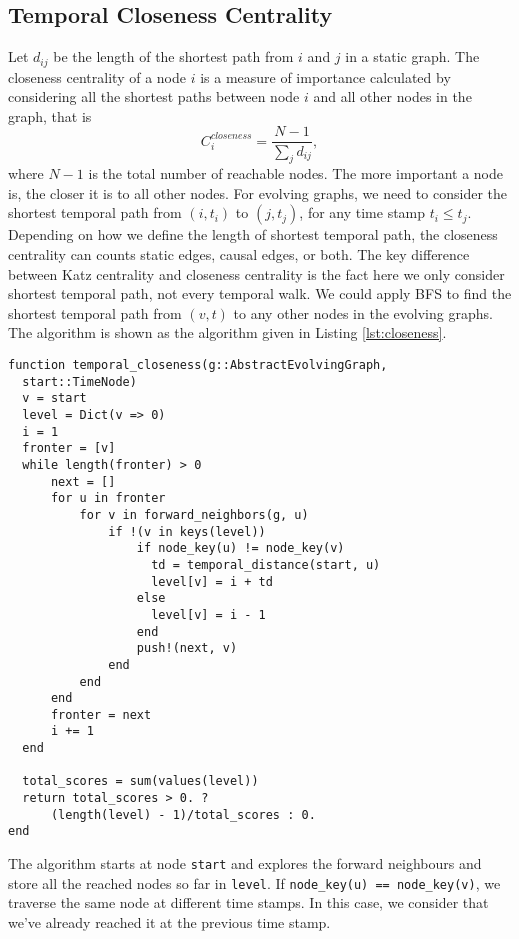 \documentclass[12pt]{article}
\theoremstyle{definition}
\begin{document}
\subsection{Temporal Closeness Centrality}
\label{sec:temp-betw-centr}

Let $d_{ij}$ be the length of the shortest path from $i$ and $j$ in a static graph. The closeness centrality of a node $i$ is a measure of importance calculated by considering all the shortest paths between node $i$ and all other nodes in the graph, that is
$$
C_i^{closeness} = \frac{N-1}{\sum_j d_{ij}},
$$
where $N-1$ is the total number of reachable nodes.
The more important a node is, the closer it is to all other nodes.
For evolving graphs, we need to consider the shortest temporal path from $(i,t_i)$ to $(j,t_j)$, for any time stamp $t_i \leq t_j$.
Depending on how we define the length of shortest temporal path, the closeness centrality can counts static edges, causal edges, or both.
The key difference between Katz centrality and closeness centrality is the fact here we only consider shortest temporal path, not every temporal walk.
We could apply BFS to find the shortest temporal path from $(v,t)$ to any other nodes in the evolving graphs. The algorithm is shown as the algorithm given in Listing
\ref{lst:closeness}.

\begin{lstlisting}[caption={Temporal Closeness of Single Node},label={lst:closeness}, captionpos=b]
function temporal_closeness(g::AbstractEvolvingGraph,
  start::TimeNode)
  v = start
  level = Dict(v => 0)
  i = 1
  fronter = [v]
  while length(fronter) > 0
      next = []
      for u in fronter
          for v in forward_neighbors(g, u)
              if !(v in keys(level))
                  if node_key(u) != node_key(v)
                    td = temporal_distance(start, u)
                    level[v] = i + td
                  else
                    level[v] = i - 1
                  end
                  push!(next, v)
              end
          end
      end
      fronter = next
      i += 1
  end

  total_scores = sum(values(level))
  return total_scores > 0. ?
      (length(level) - 1)/total_scores : 0.
end
\end{lstlisting}
The algorithm starts at node \texttt{start} and explores the forward neighbours and store all the
reached nodes so far in \texttt{level}. If \texttt{node\_key(u) == node\_key(v)}, we traverse the same node at different time stamps. In this case, we consider that we've already reached it at the previous time stamp.
\end{document}
